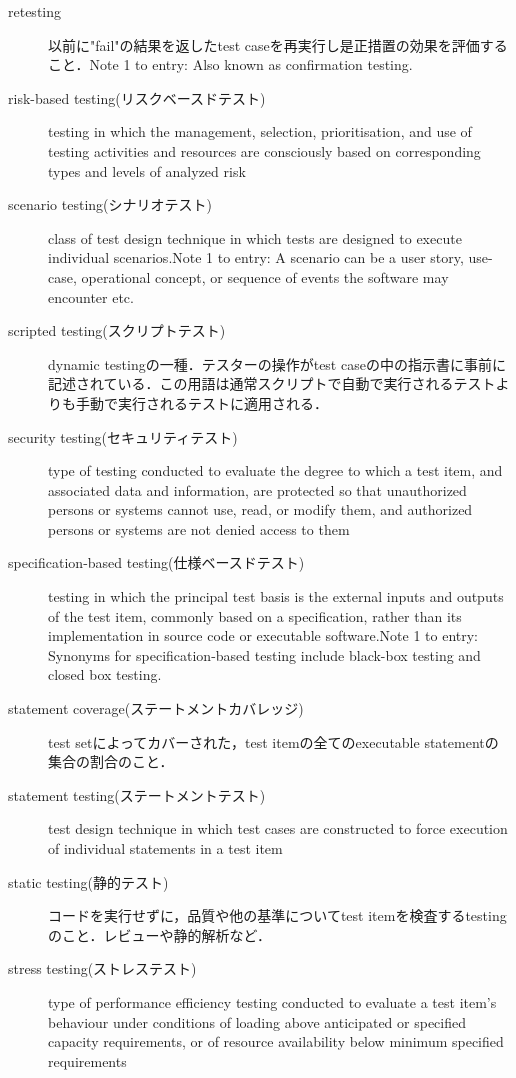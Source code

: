 \begin{description}
    \item[retesting]以前に"fail"の結果を返したtest caseを再実行し是正措置の効果を評価すること．Note 1 to entry: Also known as confirmation testing.
    \item[risk-based testing(リスクベースドテスト)]testing in which the management, selection, prioritisation, and use of testing activities and resources are consciously based on corresponding types and levels of analyzed risk
    \item[scenario testing(シナリオテスト)]class of test design technique in which tests are designed to execute individual scenarios.Note 1 to entry: A scenario can be a user story, use-case, operational concept, or sequence of events the software may encounter etc.
    \item[scripted testing(スクリプトテスト)]dynamic testingの一種．テスターの操作がtest caseの中の指示書に事前に記述されている．この用語は通常スクリプトで自動で実行されるテストよりも手動で実行されるテストに適用される．
    \item[security testing(セキュリティテスト)]type of testing conducted to evaluate the degree to which a test item, and associated data and information, are protected so that unauthorized persons or systems cannot use, read, or modify them, and authorized persons or systems are not denied access to them
    \item[specification-based testing(仕様ベースドテスト)]testing in which the principal test basis is the external inputs and outputs of the test item, commonly based on a specification, rather than its implementation in source code or executable software.Note 1 to entry: Synonyms for specification-based testing include black-box testing and closed box testing.
    \item[statement coverage(ステートメントカバレッジ)]test setによってカバーされた，test itemの全てのexecutable statementの集合の割合のこと．
    \item[statement testing(ステートメントテスト)]test design technique in which test cases are constructed to force execution of individual statements in a test item
    \item[static testing(静的テスト)]コードを実行せずに，品質や他の基準についてtest itemを検査するtestingのこと．レビューや静的解析など．
    \item[stress testing(ストレステスト)]type of performance efficiency testing conducted to evaluate a test item's behaviour under conditions of loading above anticipated or specified capacity requirements, or of resource availability below minimum specified requirements

\end{description}
